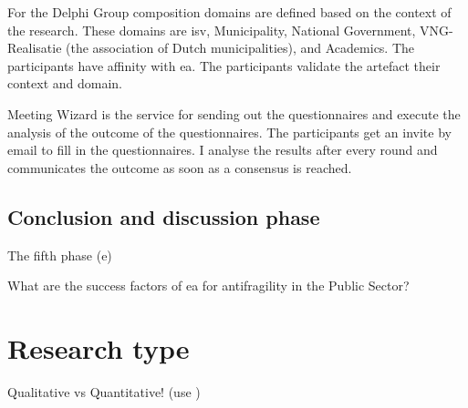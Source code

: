 For the Delphi Group composition domains are defined based on the context of the research. These domains are \acrfull{isv}, Municipality, National Government, VNG-Realisatie (the association of Dutch municipalities), and Academics. The participants have affinity with \acrshort{ea}. The participants validate the artefact their context and domain.

Meeting Wizard is the service for sending out the questionnaires and execute the analysis of the outcome of the questionnaires. The participants get an invite by email to fill in the questionnaires. I analyse the results after every round and communicates the outcome as soon as a consensus is reached.

\subsection{Conclusion and discussion phase}
\label{sub:conclusionanddiscussinophase}
The fifth phase (e)

What are the success factors of \acrlong{ea} for \gls{antifragility} in the Public Sector?

\section{Research type}

\begin{remark}
	Qualitative vs Quantitative! (use \parencite{Recker2013})
\end{remark}


